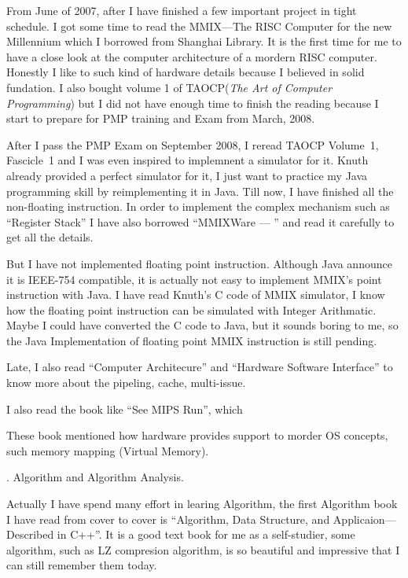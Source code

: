 From June of 2007, after I have finished a few important project in tight 
schedule. I got some time to read the MMIX---The RISC Computer for the new 
Millennium which I borrowed from Shanghai Library. It is the first time for me 
to have a close look at the computer 
architecture of a mordern RISC computer. Honestly I like to such kind of 
hardware details because I believed in solid fundation. I also bought volume 1 
of TAOCP({\it The Art of Computer Programming\/}) but I did not have enough 
time to finish the reading because I start to prepare for PMP training and Exam 
from March, 2008. 

After I pass the PMP Exam on September 2008, I reread TAOCP Volume~1, Fascicle~1
and I was even inspired to implemnent a simulator for it. Knuth already provided 
a perfect simulator for it, I just want to practice my Java programming skill by
reimplementing it in Java. Till now, I have finished all the non-floating 
instruction. In order to implement the complex mechanism such as ``Register Stack''
I have also borrowed ``MMIXWare --- '' and read it carefully to get all the details.
 
But I have not implemented floating point instruction. Although Java announce 
it is IEEE-754 compatible, it is actually not easy to implement MMIX's point 
instruction with Java. I have read Knuth's C code of MMIX simulator, I know how 
the floating point instruction can be simulated with Integer Arithmatic. Maybe I 
could have converted the C code to Java, but it sounds  boring to me, so the Java
Implementation of floating point MMIX instruction is still pending. 

Late, I also read ``Computer Architecure'' and ``Hardware Software Interface'' to 
know more about the pipeling, cache, multi-issue.

I also read the book like ``See MIPS Run'', which 

These book mentioned how hardware provides support to morder OS concepts, such 
memory mapping (Virtual Memory).

. Algorithm and Algorithm Analysis.%

Actually I have spend many effort in learing Algorithm, the first Algorithm 
book I have read from cover to cover is ``Algorithm, Data Structure, and 
Applicaion---Described in C++''. It is a good text book for me as a 
self-studier, some algorithm, such as LZ compresion algorithm, is so beautiful
and impressive that I can still remember them today.

